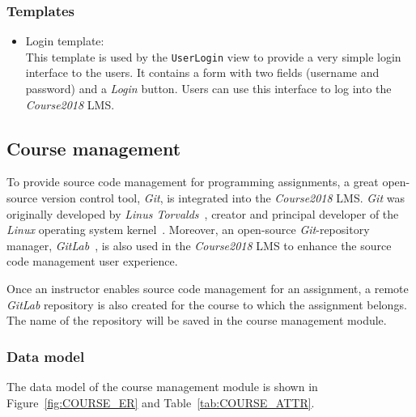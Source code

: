 \subsubsection{Templates}

\begin{itemize}
    \item Login template: \\
        This template is used by the \texttt{UserLogin} view to provide a very
        simple login interface to the users. It contains a form with two
        fields (username and password) and a \emph{Login} button. Users can
        use this interface to log into the \emph{Course2018} LMS.
\end{itemize}



\subsection{Course management}
To provide source code management for programming assignments,
a great open-source version control tool,
\emph{Git}, is integrated into the \emph{Course2018} LMS.
\emph{Git} was originally developed by \emph{Linus Torvalds}~\cite{git},
creator and principal developer of the \emph{Linux} operating system
kernel~\cite{lTorvalds}.
Moreover, 
an open-source \emph{Git}-repository manager, \emph{GitLab}~\cite{gitlab}, is also
used in the \emph{Course2018} LMS to enhance the source code management user
experience.

\medskip
Once an instructor enables source code management for an assignment, a remote
\emph{GitLab} repository is also created for the course to which the assignment
belongs. The name of the repository will be saved in the course management
module.


\subsubsection{Data model}
The data model of the course management module is shown in
Figure~\ref{fig:COURSE_ER} and Table~\ref{tab:COURSE_ATTR}. \bigskip

